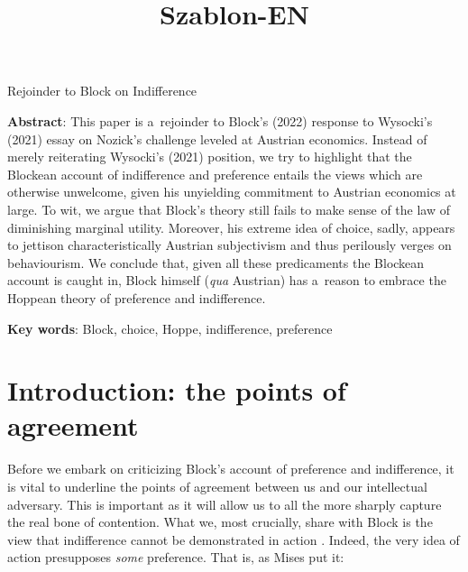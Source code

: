 \setcounter{secnumdepth}{1}

















\title{Szablon-EN}



Rejoinder to Block on Indifference





\textbf{Abstract}: This paper is a~rejoinder to Block's (2022) response to Wysocki's (2021) essay on Nozick's challenge leveled at Austrian economics. Instead of merely reiterating Wysocki's (2021) position, we try to highlight that the Blockean account of indifference and preference entails the views which are otherwise unwelcome, given his unyielding commitment to Austrian economics at large. To wit, we argue that Block's theory still fails to make sense of the law of diminishing marginal utility. Moreover, his extreme idea of choice, sadly, appears to jettison characteristically Austrian subjectivism and thus perilously verges on behaviourism. We conclude that, given all these predicaments the Blockean account is caught in, Block himself (\textit{qua} Austrian) has a~reason to embrace the Hoppean theory of preference and indifference.



\textbf{Key words}: Block, choice, Hoppe, indifference, preference



\section{Introduction: the points of agreement }

Before we embark on criticizing Block's account of preference and indifference, it is vital to underline the points of agreement between us and our intellectual adversary. This is important as it will allow us to all the more sharply capture the real bone of contention. What we, most crucially, share with Block is the view that indifference cannot be demonstrated in action 
\parencites[see e.g.,][]{block_rejoinder_2009}[][]{}. %
 Indeed, the very idea of action presupposes \textit{some} preference. That is, as Mises 
\parencite[p.97,][]{} %
 put it:



